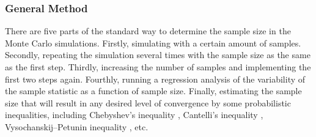\subsubsection{General Method}

There are five parts of the standard way to determine the sample size
in the Monte Carlo simulations. Firstly, simulating with a certain
amount of samples. Secondly, repeating the simulation several times
with the sample size as the same as the first step.  Thirdly,
increasing the number of samples and implementing the first two steps
again. Fourthly, running a regression analysis of the variability of
the sample statistic as a function of sample size. Finally, estimating
the sample size that will result in any desired level of convergence
by some probabilistic inequalities, including Chebyshev's inequality
\cite{chebyshev1867valeurs}, Cantelli’s inequality
\cite{cantelli1929sui}, Vysochanskij–Petunin inequality
\cite{vysochanskij1980justification}, etc.
